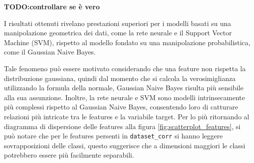 \textbf{TODO:controllare se è vero}

I risultati ottenuti rivelano prestazioni superiori per i modelli basati su una
manipolazione geometrica dei dati, come la rete neurale e il Support Vector
Machine (SVM), rispetto al modello fondato su una manipolazione probabilistica,
come il Gaussian Naive Bayes.

Tale fenomeno può essere motivato considerando che una feature non rispetta 
la distribuzione gaussiana, quindi dal momento che si calcola la verosimiglianza utilizzando la formula della normale,
Gaussian Naive Bayes risulta più sensibile alla sua assunzione. Inoltre, la rete neurale e SVM 
sono modelli intrinsecamente più complessi rispetto al Gaussian Naive Bayes,
consentendo loro di catturare relazioni più intricate tra le features e
la variabile target. Per lo più ritornando al diagramma di dispersione delle features
alla figura \ref{fig:scatterplot_features}, si può notare che per le features 
persenti in \texttt{dataset\_corr} si hanno leggere sovrapposizioni delle classi,
questo suggerisce che a dimensioni maggiori le classi potrebbero essere più facilmente
separabili.

